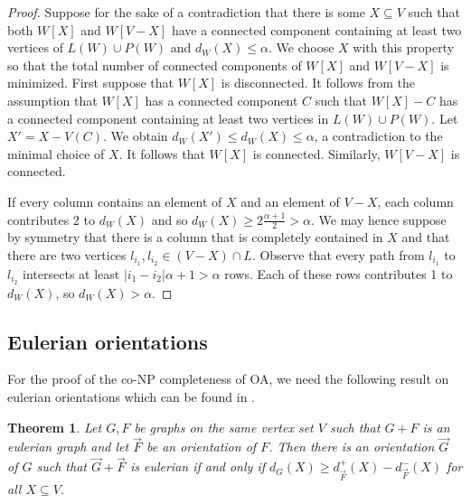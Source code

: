 \documentclass[a4paper,12pt,makeidx]{article}
\newtheorem{theo}{Theorem}
\begin{document}
\begin{proof}

Suppose for the sake of a contradiction that there is some $X \subseteq V$ such that both $W[X]$ and $W[V-X]$ have a connected component containing at least two vertices of $L(W)\cup P(W)$ and $d_W(X)\leq \alpha$. We choose $X$ with this property so that the total number of connected components of $W[X]$ and $W[V-X]$ is minimized. First suppose that $W[X]$ is disconnected. It follows from the assumption that $W[X]$ has a connected component $C$ such that $W[X]-C$ has a connected component containing at least two vertices in $L(W)\cup P(W)$. Let $X'=X-V(C)$. We obtain $d_W(X')\leq d_W(X) \leq \alpha$, a contradiction to the minimal choice of $X$. It follows that $W[X]$ is connected. Similarly, $W[V-X]$ is connected.

 If every column contains an element of $X$ and an element of $V-X$, each column contributes 2 to $d_W(X)$ and so $d_W(X)\geq 2\frac{\alpha +1}{2}>\alpha$. We may hence suppose by symmetry  that there is a column that is completely contained in $X$ and that there are two vertices $l_{i_1},l_{i_2}\in (V-X)\cap L$. Observe that every path from $l_{i_1}$ to $l_{i_2}$ intersects at least $|i_1-i_2|\alpha+1>\alpha$ rows. Each of these rows contributes 1 to $d_W(X)$, so $d_W(X)>\alpha$. 



\end{proof}
\subsection{Eulerian orientations}
For the proof of the co-NP completeness of OA, we need the following result on eulerian orientations which can be found in \cite{ff}.
\begin{theo}\label{ff}
Let $G,F$ be graphs on the same vertex set $V$ such that $G+F$ is an eulerian graph and let $\vec{F}$ be an orientation of $F$. Then there is an orientation $\vec{G}$ of $G$ such that $\vec{G}+\vec{F}$ is eulerian if and only if $d_G(X)\geq d_{\vec{F}}^+(X)-d_{\vec{F}}^-(X)$ for all $X \subseteq V$.
\end{theo}
\end{document}
